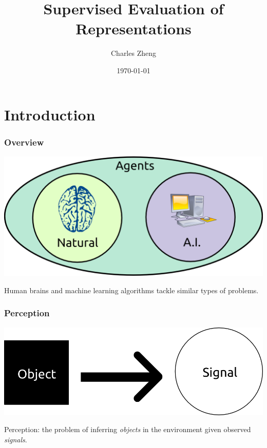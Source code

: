 \documentclass{beamer}
\title[Defense]{Supervised Evaluation of Representations}
\author{Charles Zheng} %
\institute[Stanford] %
{Stanford University}
\date{\today} %
\begin{document}
\begin{frame}
\titlepage %
\end{frame}

\section{Introduction}



\begin{frame}
\frametitle{Overview}
\begin{center}
\includegraphics[scale = 0.3]{defense_diagrams/agents.png}
\end{center}
Human brains and machine learning algorithms tackle similar types of problems.
\end{frame}

\begin{frame}
\frametitle{Perception}
\begin{center}
\includegraphics[scale = 0.4]{defense_diagrams/object_signal.png}
\end{center}
Perception: the problem of inferring \emph{objects} in the environment given observed \emph{signals}.
\end{frame}
\end{document}

